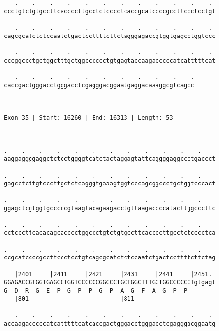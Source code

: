 \documentclass{article}
\begin{document}
\begin{Verbatim}
   .    .    .    .    .    .    .    .    .    .    .    . 
ccctgtctgtgccttcaccccttgcctctcccctcaccgcatccccgccttccctcctgt
                                                            
   .    .    .    .    .    .    .    .    .    .    .    . 
cagcgcatctctccaatctgactccttttcttctagggagaccgtggtgagcctggtccc
                                                            
   .    .    .    .    .    .    .    .    .    .    .    . 
cccggccctgctggctttgctggcccccctgtgagtaccaagacccccatcatttttcat
                                                            
   .    .    .    .    .    .    .    .    .    .    .
caccgactgggacctgggacctcgagggacggaatgaggacaaaggcgtcagcc
                                                      
                                                      
 
Exon 35 | Start: 16260 | End: 16313 | Length: 53



.    .    .    .    .    .    .    .    .    .    .    .    
aaggaggggaggctctcctggggtcatctactaggagtattcaggggaggccctgaccct
                                                            
.    .    .    .    .    .    .    .    .    .    .    .    
gagcctcttgtcccttgctctcagggtgaaagtggtcccagcggccctgctggtcccact
                                                            
.    .    .    .    .    .    .    .    .    .    .    .    
ggagctcgtggtgcccccgtaagtacagaagacctgttaagaccccatacttggcccttc
                                                            
.    .    .    .    .    .    .    .    .    .    .    .    
cctcccttcacacagcacccctggccctgtctgtgccttcaccccttgcctctcccctca
                                                            
.    .    .    .    .    .    .    .    .    .    .    .    
ccgcatccccgccttccctcctgtcagcgcatctctccaatctgactccttttcttctag
                                                            
   |2401     |2411     |2421     |2431     |2441     |2451. 
GGAGACCGTGGTGAGCCTGGTCCCCCCGGCCCTGCTGGCTTTGCTGGCCCCCCTgtgagt
G  D  R  G  E  P  G  P  P  G  P  A  G  F  A  G  P  P        
   |801                          |811                       
  
   .    .    .    .    .    .    .    .    .    .    .    . 
accaagacccccatcatttttcatcaccgactgggacctgggacctcgagggacggaatg
                                                            

\end{Verbatim}
\end{document}
